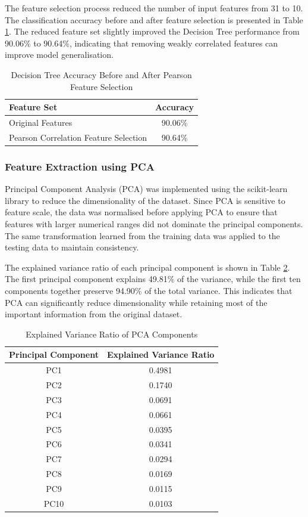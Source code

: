 \documentclass[a4paper,12pt]{article}
\begin{document}
The feature selection process reduced the number of input features from 31 to 10. The classification accuracy before and after feature selection is presented in Table \ref{tab:accuracy_comparison}. The reduced feature set slightly improved the Decision Tree performance from 90.06\% to 90.64\%, indicating that removing weakly correlated features can improve model generalisation.

\begin{table}
	\centering
	\begin{tabular}{l c}
		\hline
		\textbf{Feature Set} & \textbf{Accuracy} \\
		\hline
		Original Features & 90.06\% \\
		Pearson Correlation Feature Selection & 90.64\% \\
		\hline
	\end{tabular}
	\caption{Decision Tree Accuracy Before and After Pearson Feature Selection}
	\label{tab:accuracy_comparison}
\end{table}


\subsubsection{Feature Extraction using PCA}

Principal Component Analysis (PCA) was implemented using the scikit-learn library to reduce the dimensionality of the dataset. Since PCA is sensitive to feature scale, the data was normalised before applying PCA to ensure that features with larger numerical ranges did not dominate the principal components. The same transformation learned from the training data was applied to the testing data to maintain consistency.

The explained variance ratio of each principal component is shown in Table \ref{tab:pca_variance}. The first principal component explains 49.81\% of the variance, while the first ten components together preserve 94.90\% of the total variance. This indicates that PCA can significantly reduce dimensionality while retaining most of the important information from the original dataset.

\begin{table}
	\centering
	\begin{tabular}{c c}
		\hline
		\textbf{Principal Component} & \textbf{Explained Variance Ratio} \\
		\hline
		PC1 & 0.4981 \\
		PC2 & 0.1740 \\
		PC3 & 0.0691 \\
		PC4 & 0.0661 \\
		PC5 & 0.0395 \\
		PC6 & 0.0341 \\
		PC7 & 0.0294 \\
		PC8 & 0.0169 \\
		PC9 & 0.0115 \\
		PC10 & 0.0103 \\
		\hline
	\end{tabular}
	\caption{Explained Variance Ratio of PCA Components}
	\label{tab:pca_variance}
\end{table}
\end{document}
